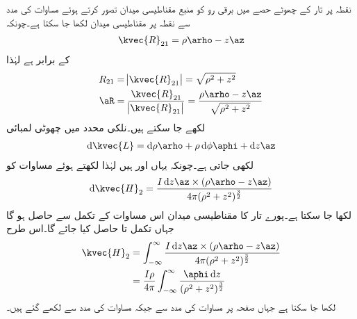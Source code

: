 نقطہ  پر تار کے چھوٹے حصے  میں برقی رو کو منبع مقناطیسی میدان تصور کرتے ہوئے مساوات  کی مدد سے نقطہ  پر مقناطیسی میدان لکھا جا سکتا ہے۔چونکہ 
\begin{align*}
\kvec{R}_{21}=\rho \arho-z \az
\end{align*}
کے برابر ہے لہٰذا
\begin{align*}
R_{21}&=\abs{\kvec{R}_{21}}=\sqrt{\rho^2+z^2}\\
\aR&=\frac{\kvec{R}_{21}}{\abs{\kvec{R}_{21}}}=\frac{\rho \arho-z \az}{\sqrt{\rho^2+z^2}}
\end{align*}
لکھے جا سکتے ہیں۔نلکی محدد میں چھوٹی لمبائی
\begin{align*}
\dif \kvec{L}=\dif \rho \arho+\rho \dif \phi \aphi+\dif z \az
\end{align*}
لکھی جاتی ہے۔چونکہ یہاں  اور  ہیں لہٰذا  لکھتے ہوئے  مساوات  کو
\begin{align*}
\dif \kvec{H}_2=\frac{I \dif z \az \times (\rho \arho -z\az)}{4 \pi (\rho^2+z^2)^{\frac{3}{2}}}
\end{align*}
لکھا جا سکتا ہے۔پورے تار کا مقناطیسی میدان اس مساوات کے تکمل سے حاصل ہو گا جہاں تکمل تا  حاصل کیا جائے گا۔اس طرح
\begin{align*}
\kvec{H}_2&=\int_{-\infty}^{\infty}\frac{I \dif z \az \times (\rho \arho -z\az)}{4 \pi (\rho^2+z^2)^{\frac{3}{2}}}\\
&=\frac{I \rho}{4\pi}\int_{-\infty}^{\infty} \frac{\aphi \dif z }{(\rho^2+z^2)^{\frac{3}{2}}}
\end{align*}    
لکھا جا سکتا ہے جہاں صفحہ  پر مساوات  کی مدد سے  جبکہ مساوات  کی مدد سے  لکھے گئے ہیں۔

